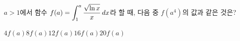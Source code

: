 $a>1$에서 함수 $f(a)=\displaystyle\int_{1}^{a}\dfrac{\sqrt{\ln x}}{x}\mkern3mu dx$라 할 때, 다음 중 $f(a^4)$의 값과 같은 것은?
\begin{choices32}{$4f(a)$}{$8f(a)$}{$12f(a)$}{$16f(a)$}{$20f(a)$}\end{choices32}
